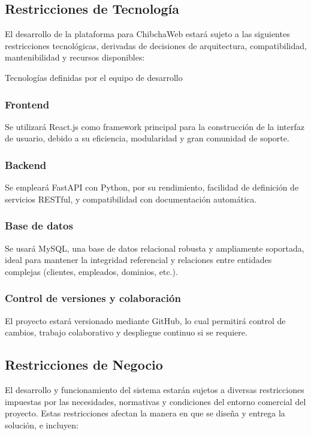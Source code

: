 \subsection{Restricciones de Tecnología}
El desarrollo de la plataforma para ChibchaWeb estará sujeto a las siguientes restricciones tecnológicas, derivadas de decisiones de arquitectura, compatibilidad, mantenibilidad y recursos disponibles:

Tecnologías definidas por el equipo de desarrollo

 \subsubsection{Frontend}

Se utilizará React.js como framework principal para la construcción de la interfaz de usuario, debido a su eficiencia, modularidad y gran comunidad de soporte.

\subsubsection{Backend}

Se empleará FastAPI con Python, por su rendimiento, facilidad de definición de servicios RESTful, y compatibilidad con documentación automática.

\subsubsection{Base de datos}

Se usará MySQL, una base de datos relacional robusta y ampliamente soportada, ideal para mantener la integridad referencial y relaciones entre entidades complejas (clientes, empleados, dominios, etc.).

\subsubsection{Control de versiones y colaboración}

El proyecto estará versionado mediante GitHub, lo cual permitirá control de cambios, trabajo colaborativo y despliegue continuo si se requiere.

\subsection{Restricciones de Negocio}
El desarrollo y funcionamiento del sistema estarán sujetos a diversas restricciones impuestas por las necesidades, normativas y condiciones del entorno comercial del proyecto. Estas restricciones afectan la manera en que se diseña y entrega la solución, e incluyen:

